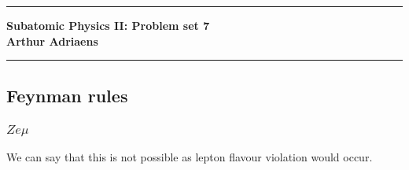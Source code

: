 \documentclass[10pt,a4paper,twoside]{article}
\begin{document}
	\begin{center}
		\hrule
		\vspace{.4cm}
		{\bf {\huge Subatomic Physics II: Problem set 7}}
		\vspace{.2cm}
		\\
		{\bf Arthur Adriaens}
		\vspace{.2cm}
		\hrule
	\end{center}
\subsection{Feynman rules}
\subsubsection{$Ze\mu$}
We can say that this is not possible as lepton flavour violation would occur.
\end{document}
